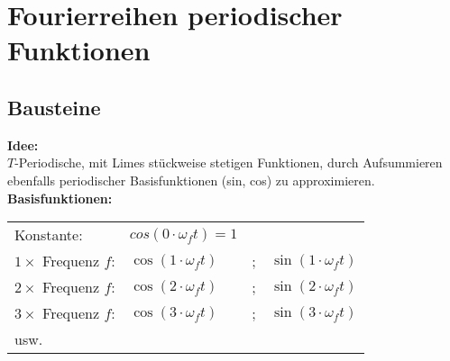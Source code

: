 \section{Fourierreihen periodischer Funktionen}
	\subsection{Bausteine}
		\textbf{Idee:}\\[3pt]
		$T$-Periodische, mit Limes stückweise stetigen Funktionen, durch Aufsummieren ebenfalls periodischer Basisfunktionen
		(sin, cos) zu approximieren.\\[3pt]

		\textbf{Basisfunktionen:}\\[3pt]
		\begin{minipage}[b]{0.5\textwidth}
			\begin{tabular}{|llll|}
				\hline
				Konstante: & $cos(0 \cdot \omega_{f} t) = 1$ & &\\[3pt]
				$1 \times$ Frequenz $f$: & $\cos(1 \cdot \omega_{f} t)$ & ; & $\sin(1 \cdot \omega_{f} t)$\\[3pt]
				$2 \times$ Frequenz $f$: & $\cos(2 \cdot \omega_{f} t)$ & ; & $\sin(2 \cdot \omega_{f} t)$\\[3pt]
				$3 \times$ Frequenz $f$: & $\cos(3 \cdot \omega_{f} t)$ & ; & $\sin(3 \cdot \omega_{f} t)$\\[3pt]
				usw. & & &\\[3pt]
				\hline
			\end{tabular}
		\end{minipage}
		\begin{minipage}[]{0.5\textwidth}
			\scalebox{0.8}{}
		\end{minipage}\\[3pt]
	
